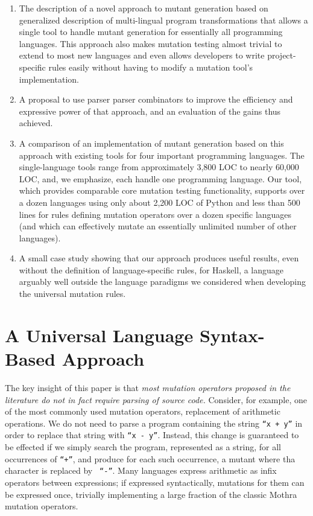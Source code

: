 \documentclass[sigconf,review, anonymous]{acmart}
\begin{document}
\begin{enumerate}
  \item The description of a novel approach to mutant generation
    based on generalized description of multi-lingual program transformations
    that allows a single tool to handle mutant generation for
    essentially all programming languages.  This approach also makes
    mutation testing almost trivial to extend to most new languages and even allows
    developers to write project-specific rules easily without
    having to modify a mutation tool's implementation.

          \item A proposal to use parser parser combinators to improve the
      efficiency and expressive power of that approach, and an
      evaluation of the gains thus achieved.

    
      \item A comparison of an implementation of mutant generation
       based on this approach with existing tools for four important
       programming languages.  The single-language tools range from
       approximately 3,800 LOC to nearly 60,000 LOC, and, we emphasize, each handle
       one programming language.  Our tool, which provides comparable
       core mutation testing functionality, supports over a dozen
       languages using only about 2,200 LOC of Python and less than 500
       lines for rules defining mutation operators over a dozen
       specific languages (and which can effectively mutate an
       essentially unlimited number of other languages).

       \item A small case study showing that our approach produces
         useful results, even without the definition of
         language-specific rules, for Haskell, a language arguably
         well outside the language paradigms we considered when
         developing the universal mutation rules.

\end{enumerate}


\section{A Universal Language Syntax-Based Approach}

The key insight of this paper is that \emph{most mutation operators
  proposed in the literature do not in fact require parsing of source
  code.}  Consider, for example, one of the most commonly used
mutation operators, replacement of arithmetic operations.  We do not
need to parse a program containing the string {\tt ``x + y''} in order to
replace that string with {\tt ``x - y''}.  Instead, this change is
guaranteed to be effected if we simply search the program, represented
as a string, for all occurrences of  {\tt ``+''}, and produce for each
such occurrence, a mutant where tha character is replaced by {\tt
  ``-''}.  Many languages express arithmetic as infix operators between
expressions; if expressed syntactically, mutations for them can be expressed
once, trivially implementing a large fraction of the classic Mothra~\cite{offutt1996experimental}
mutation operators.
\end{document}
